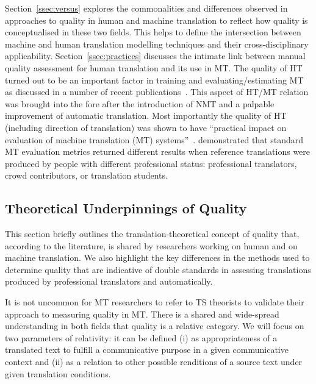 Section~\ref{ssec:versus} explores the commonalities and differences observed in approaches to quality in human and machine translation to reflect how quality is conceptualised in these two fields. This helps to define the intersection between machine and human translation modelling techniques and their cross-disciplinary applicability.
Section~\ref{ssec:practices} discusses the intimate link between manual quality assessment for human translation and its use in MT. The quality of HT turned out to be an important factor in training and evaluating/estimating MT as discussed in a number of recent publications~\cite[see, for example,][]{Popovic2020, Laubli2020}. This aspect of HT/MT relation was brought into the fore after the introduction of NMT and a palpable improvement of automatic translation. Most importantly the quality of HT (including direction of translation) was shown to have ``practical impact on evaluation of machine translation (MT) systems''~\cite[p.365]{Popovic2020}. \citet{Popovic2020} demonstrated that standard MT evaluation metrics returned different results when reference translations were produced by people with different professional status: professional translators, crowd contributors, or translation students.

\subsection{\label{ssec:theory}Theoretical Underpinnings of Quality} 

This section briefly outlines the translation-theoretical concept of quality that, according to the literature, is shared by researchers working on human and on machine translation. We also highlight the key differences in the methods used to determine quality that are indicative of double standards in assessing translations produced by professional translators and automatically. 

It is not uncommon for MT researchers to refer to TS theorists to validate their approach to measuring quality in MT. There is a shared and wide-spread understanding in both fields that quality is a relative category. We will focus on two parameters of \hypertarget{wd:relativity}{relativity}: it can be defined (i) as appropriateness of a translated text to fulfill a communicative purpose in a given communicative context and (ii) as a relation to other possible renditions of a source text under given translation conditions.

